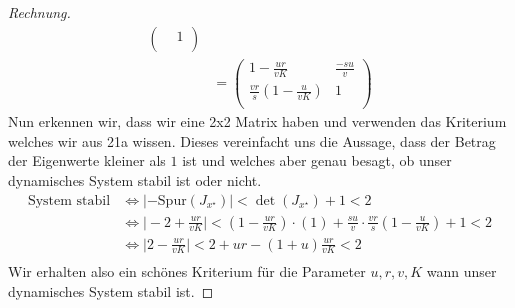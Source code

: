 \documentclass[a4paper]{article}
\begin{document}
\begin{theorem}
\begin{proof}[Rechnung]
\begin{align*}
\begin{pmatrix}
						& 1 \\
			\end{pmatrix} \\
				   &= \begin{pmatrix} 
					   1 - \frac{ ur }{ vK } & \frac{ -su }{ v } \\
					   \frac{ vr }{ s } ( 1 - \frac{ u }{ vK } ) & 1 \\
				   \end{pmatrix} 
		\end{align*}
		Nun erkennen wir, dass wir eine 2x2 Matrix haben und verwenden das Kriterium welches wir aus 21a wissen.
		Dieses vereinfacht uns die Aussage, dass der Betrag der Eigenwerte kleiner als $1$ ist und welches
		aber genau besagt, ob unser dynamisches System stabil ist oder nicht.
		\begin{align*}
			\text{System stabil} & \Leftrightarrow
			| - \text{Spur} (J_{x ^{\star}}) | < \det (J_{x ^{\star}}) + 1 < 2 \\
				 & \Leftrightarrow \Big | -2 + \frac{ ur }{ vK } \Big |
				 < \left(
				 	1 - \frac{ ur }{ vK }
				\right) \cdot (1) + \frac{ su }{ v } \cdot \frac{ vr }{ s } \left(
					1 - \frac{ u }{ vK }
				\right) + 1 < 2 \\
				 & \Leftrightarrow \Big | 2 - \frac{ ur }{ vK } \Big |
				 < 2 + ur - (1 + u) \frac{ ur }{ vK } < 2 \\
		\end{align*}
		Wir erhalten also ein schönes Kriterium für die Parameter $u, r, v, K$ wann unser dynamisches System stabil ist.
	\end{proof}
	\end{theorem}
\end{document}
